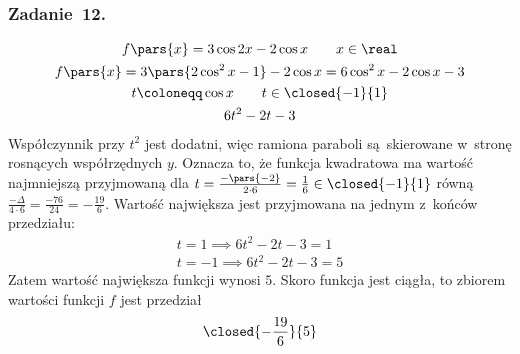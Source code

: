 \subsubsection*{Zadanie~12.}
\begin{gather*}
    f\pars{x} = 3\cos2x - 2\cos x \qquad x \in \real\\
    f\pars{x} = 3\pars{2\cos^2x - 1} - 2\cos x = 6\cos^2x - 2\cos x - 3\\
    t \coloneqq \cos x \qquad t \in \closed{-1}{1}\\
    6t^2 - 2t - 3
\end{gather*}
Współczynnik przy \(t^2\) jest dodatni, więc ramiona paraboli są skierowane w~stronę rosnących współrzędnych \(y\). Oznacza to, że funkcja kwadratowa ma wartość najmniejszą przyjmowaną dla \(t = \frac{-\pars{-2}}{2 \cdot 6} = \frac{1}{6} \in \closed{-1}{1}\) równą \(\frac{-\Delta}{4 \cdot 6} = \frac{-76}{24} = -\frac{19}{6}\). Wartość największa jest przyjmowana na jednym z~końców przedziału:
\begin{gather*}
    t = 1 \implies 6t^2 - 2t - 3 = 1\\
    t = -1 \implies 6t^2 - 2t - 3 = 5
\end{gather*}
Zatem wartość największa funkcji wynosi \(5\). Skoro funkcja jest ciągła, to zbiorem wartości funkcji \(f\) jest przedział
\begin{equation*}
    \closed{-\frac{19}{6}}{5}
\end{equation*}